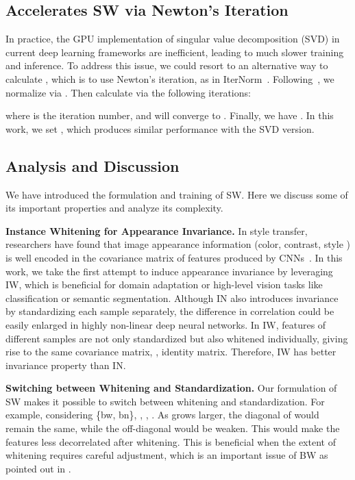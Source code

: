 \documentclass[10pt,twocolumn,letterpaper]{article}
\begin{document}
\subsection{Accelerates SW via Newton's Iteration}

In practice, the GPU implementation of singular value decomposition (SVD) in current deep learning frameworks are inefficient, leading to much slower training and inference.
To address this issue, we could resort to an alternative way to calculate , which is to use Newton's iteration, as in IterNorm~\cite{huang2019iterative}.
Following~\cite{huang2019iterative}, we normalize  via .
Then calculate  via the following iterations:

where  is the iteration number, and  will converge to .
Finally, we have .
In this work, we set , which produces similar performance with the SVD version.

\subsection{Analysis and Discussion}
We have introduced the formulation and training of SW.
Here we discuss some of its important properties and analyze its complexity.

\noindent\textbf{Instance Whitening for Appearance Invariance. }
In style transfer, researchers have found that image appearance information (\ie color, contrast, style \etc) is well encoded in the covariance matrix of features produced by CNNs~\cite{li2017universal}.
In this work, we take the first attempt to induce appearance invariance by leveraging IW, which is beneficial for domain adaptation or high-level vision tasks like classification or semantic segmentation.
Although IN also introduces invariance by standardizing each sample separately, the difference in correlation could be easily enlarged in highly non-linear deep neural networks.
In IW, features of different samples are not only standardized but also whitened individually, giving rise to the same covariance matrix, \ie, identity matrix.
Therefore, IW has better invariance property than IN.







\noindent\textbf{Switching between Whitening and Standardization.}
Our formulation of SW makes it possible to switch between whitening and standardization.
For example, considering  \{bw, bn\}, \ie, , .
As  grows larger, the diagonal of  would remain the same, while the off-diagonal would be weaken.
This would make the features less decorrelated after whitening.
This is beneficial when the extent of whitening requires careful adjustment, which is an important issue of BW as pointed out in \cite{lei2018decorrelated}.
\end{document}
